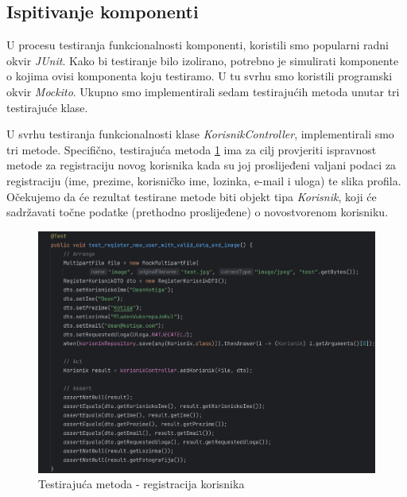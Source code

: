

\subsection{Ispitivanje komponenti}
U procesu testiranja funkcionalnosti komponenti,  koristili smo popularni radni okvir \textit{JUnit}. Kako bi testiranje bilo izolirano, potrebno je simulirati komponente o kojima ovisi komponenta koju testiramo. U tu svrhu smo koristili programski okvir \textit{Mockito}. Ukupno smo implementirali sedam testirajućih metoda unutar tri testirajuće klase.

\vspace{1em}

U svrhu testiranja funkcionalnosti klase \textit{KorisnikController}, implementirali smo tri metode. Specifično, testirajuća metoda \ref{fig:test1} ima za cilj provjeriti ispravnost metode za registraciju novog korisnika kada su joj proslijeđeni valjani podaci za registraciju (ime, prezime, korisničko ime, lozinka, e-mail i uloga) te slika profila. Očekujemo da će rezultat testirane metode biti objekt tipa \textit{Korisnik}, koji će sadržavati točne podatke (prethodno proslijeđene) o novostvorenom korisniku.

\begin{figure}[H]
	\includegraphics[scale=0.15]{slike/test1.png}
	\centering
	\caption{Testirajuća metoda - registracija korisnika}
	\label{fig:test1}
\end{figure}

